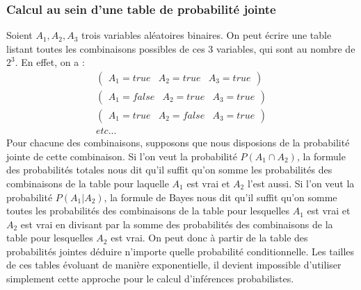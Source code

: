 \documentclass[a4paper]{article}
\begin{document}
    \subsubsection{Calcul au sein d'une table de probabilité jointe}
Soient $A_1,A_2,A_3$ trois variables aléatoires binaires. On peut écrire une table listant toutes les combinaisons possibles de ces 3 variables, qui sont au nombre de $2^3$.\newline
En effet, on a :
\begin{align*}
\begin{pmatrix} A_1 = true & A_2 = true & A_3 = true\end{pmatrix}\\
\begin{pmatrix} A_1 = false & A_2 = true & A_ 3 = true\end{pmatrix} \\
\begin{pmatrix} A_1 = true & A_2 = false & A_ 3 = true\end{pmatrix} \\ etc...
\end{align*}
Pour chacune des combinaisons, supposons que nous disposions de la probabilité jointe de cette combinaison.\newline
Si l'on veut la probabilité $P(A_1 \cap A_2)$, la formule des probabilités totales nous dit qu'il suffit qu'on somme les probabilités des combinaisons de la table pour laquelle $A_1$ est vrai et $A_2$ l'est aussi.
\newline
Si l'on veut la probabilité $P(A_1|A_2)$, la formule de Bayes nous dit qu'il suffit qu'on somme toutes les probabilités des combinaisons de la table pour lesquelles $A_1$ est vrai et $A_2$ est vrai en divisant
par la somme des probabilités des combinaisons de la table pour lesquelles $A_2$
est vrai.
\newline
On peut donc à partir de la table des probabilités jointes déduire n'importe quelle probabilité conditionnelle. Les tailles de ces tables évoluant de manière exponentielle, il devient impossible d'utiliser
simplement cette approche pour le calcul d'inférences probabilistes.
\end{document}
